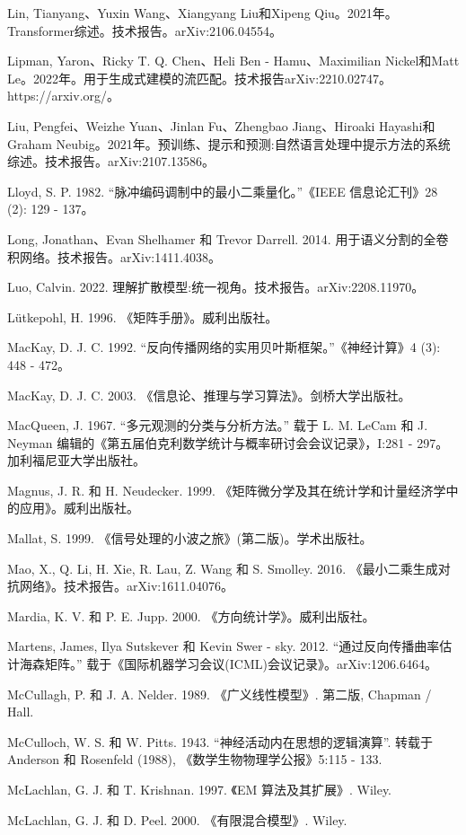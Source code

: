 \documentclass[10pt]{report}
\begin{document}
Lin, Tianyang、Yuxin Wang、Xiangyang Liu和Xipeng Qiu。2021年。Transformer综述。技术报告。arXiv:2106.04554。

Lipman, Yaron、Ricky T. Q. Chen、Heli Ben - Hamu、Maximilian Nickel和Matt Le。2022年。用于生成式建模的流匹配。技术报告arXiv:2210.02747。https://arxiv.org/。

Liu, Pengfei、Weizhe Yuan、Jinlan Fu、Zhengbao Jiang、Hiroaki Hayashi和Graham Neubig。2021年。预训练、提示和预测:自然语言处理中提示方法的系统综述。技术报告。arXiv:2107.13586。

Lloyd, S. P. 1982. “脉冲编码调制中的最小二乘量化。”《IEEE 信息论汇刊》28 (2): 129 - 137。

Long, Jonathan、Evan Shelhamer 和 Trevor Darrell. 2014. 用于语义分割的全卷积网络。技术报告。arXiv:1411.4038。

Luo, Calvin. 2022. 理解扩散模型:统一视角。技术报告。arXiv:2208.11970。

Lütkepohl, H. 1996. 《矩阵手册》。威利出版社。

MacKay, D. J. C. 1992. “反向传播网络的实用贝叶斯框架。”《神经计算》4 (3): 448 - 472。

MacKay, D. J. C. 2003. 《信息论、推理与学习算法》。剑桥大学出版社。

MacQueen, J. 1967. “多元观测的分类与分析方法。” 载于 L. M. LeCam 和 J. Neyman 编辑的《第五届伯克利数学统计与概率研讨会会议记录》，I:281 - 297。加利福尼亚大学出版社。

Magnus, J. R. 和 H. Neudecker. 1999. 《矩阵微分学及其在统计学和计量经济学中的应用》。威利出版社。

Mallat, S. 1999. 《信号处理的小波之旅》(第二版)。学术出版社。

Mao, X., Q. Li, H. Xie, R. Lau, Z. Wang 和 S. Smolley. 2016. 《最小二乘生成对抗网络》。技术报告。arXiv:1611.04076。

Mardia, K. V. 和 P. E. Jupp. 2000. 《方向统计学》。威利出版社。

Martens, James, Ilya Sutskever 和 Kevin Swer - sky. 2012. “通过反向传播曲率估计海森矩阵。” 载于《国际机器学习会议(ICML)会议记录》。arXiv:1206.6464。

McCullagh, P. 和 J. A. Nelder. 1989. 《广义线性模型》. 第二版, Chapman / Hall.

McCulloch, W. S. 和 W. Pitts. 1943. “神经活动内在思想的逻辑演算”. 转载于 Anderson 和 Rosenfeld (1988), 《数学生物物理学公报》5:115 - 133.

McLachlan, G. J. 和 T. Krishnan. 1997. 《EM 算法及其扩展》. Wiley.

McLachlan, G. J. 和 D. Peel. 2000. 《有限混合模型》. Wiley.
\end{document}

